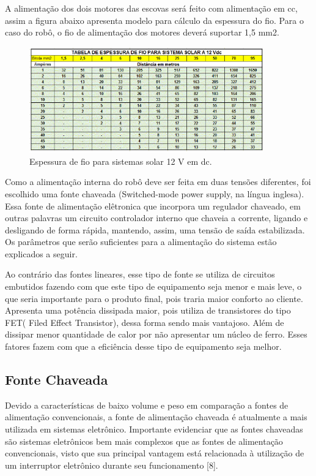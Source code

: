 A alimentação dos dois motores das escovas será feito com alimentação em cc, assim a figura abaixo apresenta modelo para cálculo da espessura do fio. Para o caso do robô, o fio de alimentação dos motores deverá suportar 1,5 mm2.
\par
\begin{figure}[h]
  \centering
  \includegraphics[width=0.9\textwidth]{figures/table-wire.png}
  \caption{Espessura de fio para sistemas solar 12 V em dc.}
  \label{fig:table-wire}
\end{figure}
\FloatBarrier
\par
Como a alimentação interna do robô deve ser feita em duas tensões diferentes, foi escolhido uma fonte chaveada (Switched-mode power supply, na língua inglesa). Essa fonte de alimentação elêtronica que incorpora um regulador chaveado, em outras palavras um circuito controlador interno que chaveia a corrente, ligando e desligando de forma rápida, mantendo, assim, uma tensão de saída estabilizada. Os parâmetros que serão suficientes para a alimentação do sistema estão explicados a seguir.

Ao contrário das fontes lineares, esse tipo de fonte se utiliza de circuitos embutidos fazendo com que este tipo de equipamento seja menor e mais leve, o que seria importante para o produto final, pois traria maior conforto ao cliente. Apresenta uma potência dissipada maior, pois utiliza de transistores do tipo FET( Filed Effect Transistor), dessa forma sendo mais vantajoso. Além de dissipar menor quantidade de calor por não apresentar um núcleo de ferro. Esses fatores fazem com que a eficiência desse tipo de equipamento seja melhor.

\subsection{Fonte Chaveada}
Devido a características de baixo volume e peso em comparação a fontes de alimentação convencionais, a fonte de alimentação chaveada é atualmente a mais utilizada em sistemas eletrônico. Importante evidenciar que as fontes chaveadas são sistemas eletrônicos bem mais complexos que as fontes de alimentação convencionais, visto que sua principal vantagem está relacionada à utilização de um interruptor eletrônico durante seu funcionamento [8].

